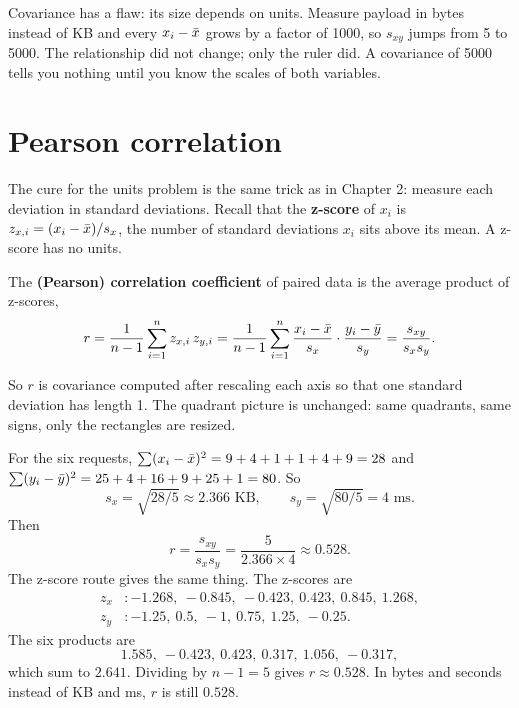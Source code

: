 Covariance has a flaw: its size depends on units. Measure payload in bytes instead
of KB and every $x_i - \bar{x}$ grows by a factor of 1000, so $s_{xy}$ jumps from 5
to 5000. The relationship did not change; only the ruler did. A covariance of 5000
tells you nothing until you know the scales of both variables.

\section{Pearson correlation}
\label{sec:corr-pearson}

The cure for the units problem is the same trick as in Chapter 2: measure each
deviation in standard deviations. Recall that the \textbf{z-score} of $x_i$ is
$z_{x,i} = (x_i - \bar{x})/s_x$, the number of standard deviations $x_i$ sits above
its mean. A z-score has no units.

\begin{definition}
The \textbf{(Pearson) correlation coefficient} of paired data is the average product
of z-scores,
\[
  r = \frac{1}{n-1}\sum_{i=1}^{n} z_{x,i}\,z_{y,i}
    = \frac{1}{n-1}\sum_{i=1}^{n}\frac{x_i-\bar{x}}{s_x}\cdot\frac{y_i-\bar{y}}{s_y}
    = \frac{s_{xy}}{s_x s_y}.
\]
\end{definition}

So $r$ is covariance computed after rescaling each axis so that one standard
deviation has length 1. The quadrant picture is unchanged: same quadrants, same
signs, only the rectangles are resized.

\begin{example}
For the six requests, $\sum (x_i-\bar{x})^2 = 9+4+1+1+4+9 = 28$ and
$\sum (y_i-\bar{y})^2 = 25+4+16+9+25+1 = 80$. So
\[
  s_x = \sqrt{28/5} \approx 2.366 \text{ KB}, \qquad s_y = \sqrt{80/5} = 4 \text{ ms}.
\]
Then
\[
  r = \frac{s_{xy}}{s_x s_y} = \frac{5}{2.366 \times 4} \approx 0.528 .
\]
The z-score route gives the same thing. The z-scores are
\begin{align*}
  z_x &: -1.268,\ -0.845,\ -0.423,\ 0.423,\ 0.845,\ 1.268,\\
  z_y &: -1.25,\ 0.5,\ -1,\ 0.75,\ 1.25,\ -0.25.
\end{align*}
The six products are
\[
  1.585,\ -0.423,\ 0.423,\ 0.317,\ 1.056,\ -0.317,
\]
which sum to $2.641$. Dividing by $n-1=5$ gives $r \approx 0.528$. In bytes and
seconds instead of KB and ms, $r$ is still $0.528$.
\end{example}


